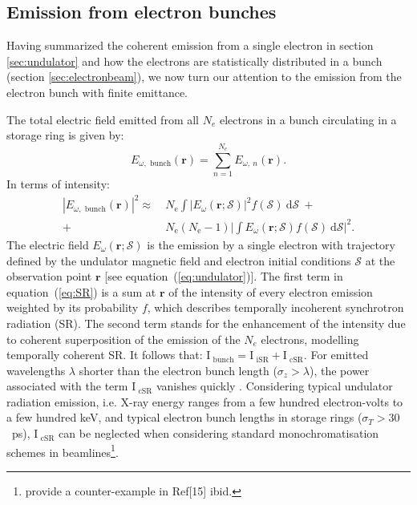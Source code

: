 \documentclass{iucr}              %
\newcommand{\remove}[1]{ {\color{blue} \sout{#1}}}
\begin{document}
\subsection{Emission from electron bunches}

Having summarized the coherent emission from a single electron in section \ref{sec:undulator} and how the electrons are statistically distributed in a bunch (section \ref{sec:electronbeam}), we now turn our attention to the emission from the electron bunch with finite emittance.

The total electric field emitted from all $N_e$ electrons in a bunch circulating in a storage ring is given by: 
\begin{equation}
    E_{\omega,\text{~bunch}}(\textbf{r}) = \sum_{n=1}^{N_e} E_{\omega,~n}(\textbf{r}).
\end{equation}
In terms of intensity: 
\begin{equation}
\begin{split}
|E_{\omega,\text{~bunch}}(\textbf{r})|^2 \approx ~&N_\text{e} \int\big| E_\omega(\textbf{r};\mathcal{S})\big|^2 f(\mathcal{S})~ \text{d}\mathcal{S}~+\\
+~ &N_\text{e}(N_\text{e}-1)\bigg| \int E_\omega(\textbf{r};\mathcal{S}) f(\mathcal{S})~ \text{d}\mathcal{S} \bigg|^2.
\end{split}
\label{eq:SR}
\end{equation}
The electric field $E_\omega(\textbf{r};\mathcal{S})$ is the emission by a single electron with trajectory defined by the undulator magnetic field and electron initial conditions $\mathcal{S}$
at the observation point $\textbf{r}$ [see equation~(\ref{eq:undulator})]. The first term in equation~(\ref{eq:SR}) is a sum at $\textbf{r}$ of the intensity of every electron emission weighted by its probability $f$, which describes temporally incoherent synchrotron radiation (SR). The second term stands for the enhancement of the intensity due to coherent superposition of the emission of the $N_e$ electrons, modelling temporally coherent SR. It follows that: $\text{I}_\text{~bunch} = \text{I}_\text{~iSR}+\text{I}_\text{~cSR}$.
For emitted wavelengths $\lambda$ shorter than the electron bunch length ($\sigma_z > \lambda$), the power associated with the term $\text{I}_\text{~cSR}$ vanishes quickly \cite{CSR,Wiedemann2015}. Considering typical undulator radiation emission, i.e. X-ray energy ranges from a few hundred electron-volts to a few hundred keV, and typical electron bunch lengths in storage rings ($\sigma_{T}>30$~ps), $\text{I}_\text{~cSR}$ can be neglected when considering standard monochromatisation schemes in beamlines\footnote{ provide a counter-example in Ref[15] ibid.}.
\end{document}
